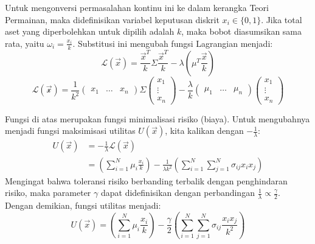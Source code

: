 Untuk mengonversi permasalahan kontinu ini ke dalam kerangka Teori Permainan, maka didefinisikan variabel keputusan diskrit $x_i \in \{0, 1\}$. Jika total aset yang diperbolehkan untuk dipilih adalah $k$, maka bobot diasumsikan sama rata, yaitu $\omega_i = \frac{x_i}{k}$. Substitusi ini mengubah fungsi Lagrangian menjadi:
\begin{equation}
    \mathcal{L}(\vec{x}) = \frac{\vec{x}^T}{k}\Sigma \frac{\vec{x}^T}{k} - \lambda \left(\mu^T\frac{\vec{x}}{k}\right)
\end{equation}
\begin{equation}
    \mathcal{L(\vec{x})} = \frac{1}{k^2}\begin{pmatrix} x_1 & \dots & x_n\end{pmatrix} 
    \Sigma
    \begin{pmatrix}x_1 \\ \vdots \\ x_n\end{pmatrix} 
    - \frac{\lambda}{k} \begin{pmatrix}\mu_1 & \dots & \mu_n\end{pmatrix} 
    \begin{pmatrix}x_1 \\ \vdots \\ x_n\end{pmatrix}
\end{equation}

Fungsi di atas merupakan fungsi minimalisasi risiko (biaya). Untuk mengubahnya menjadi fungsi maksimisasi utilitas $U(\vec{x})$, kita kalikan dengan $-\frac{1}{\lambda}$:
\begin{equation}
\begin{split}
    U(\vec{x}) &= -\frac{1}{\lambda} \mathcal{L}(\vec{x}) \\
    &= \left(\sum_{i=1}^N \mu_i \frac{x_i}{k}\right) - \frac{1}{\lambda k^2}\left(\sum_{i=1}^N\sum_{j=1}^N \sigma_{ij} x_i x_j\right)
\end{split}
\end{equation}
Mengingat bahwa toleransi risiko berbanding terbalik dengan penghindaran risiko, maka parameter $\gamma$ dapat didefinisikan dengan perbandingan  $\frac{1}{\lambda} \propto \frac{\gamma}{2}$. Dengan demikian, fungsi utilitas menjadi:
\begin{equation}
    U(\vec{x}) = \left(\sum_{i=1}^N \mu_i \frac{x_i}{k}\right) - \frac{\gamma}{2}\left(\sum_{i=1}^N\sum_{j=1}^N \sigma_{ij} \frac{x_i x_j}{k^2}\right)
\end{equation}

